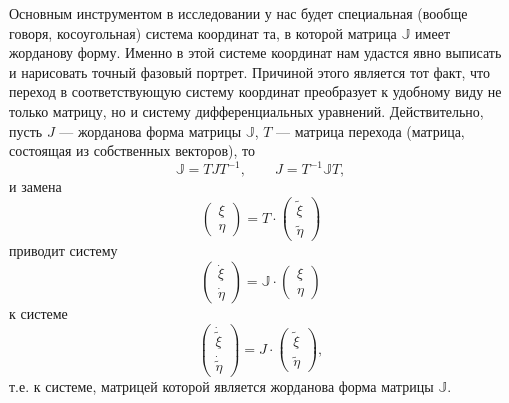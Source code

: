 \documentclass[12pt, a4paper]{article}
\begin{document}
	Основным инструментом в исследовании у нас будет специальная (вообще говоря, косоугольная) система координат та, в которой матрица $\mathbb{J}$ имеет жорданову форму. Именно в этой системе координат нам удастся явно выписать и нарисовать точный фазовый портрет. Причиной этого является тот факт, что переход в соответствующую систему координат преобразует к удобному виду не только матрицу, но и систему дифференциальных уравнений. Действительно, пусть $J$ --- жорданова форма матрицы $\mathbb{J}$, $T$ --- матрица перехода (матрица, состоящая из собственных векторов), то
	\[
	\mathbb{J}=TJT^{-1}, \qquad J=T^{-1}\mathbb{J}T,
	\]
	и замена
	\[
	\left(\begin{gathered}
		\xi \\
		\eta
	\end{gathered}
	\right)=
	T\cdot
	\left(\begin{gathered}
		\tilde\xi \\
		\tilde\eta
	\end{gathered}\right)
	\]
	приводит систему
	\[
	\left(\begin{gathered}
		\dot\xi \\
		\dot\eta
	\end{gathered}
	\right)=
	\mathbb{J}\cdot
	\left(\begin{gathered}
		\xi \\
		\eta
	\end{gathered}\right)
	\]
	к системе
	\begin{equation}
		\left(\begin{gathered}
			\dot{\tilde\xi} \\
			\dot{\tilde\eta}
		\end{gathered}
		\right)=
		J\cdot
		\left(\begin{gathered}
			\tilde\xi \\
			\tilde\eta
		\end{gathered}\right),
		\label{system12}
	\end{equation}
	т.е. к системе, матрицей которой является жорданова форма матрицы $\mathbb{J}$.
\end{document}
